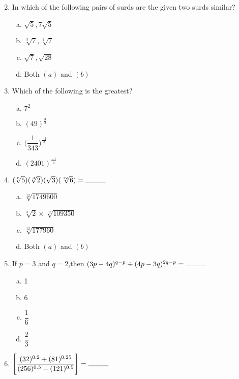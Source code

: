\begin{multicols}{2}
\begin{enumerate}
\begin{multicols}{2}
\begin{enumerate}[(a)]
\end{enumerate}
\end{multicols}
\item In which of the following pairs of surds are the given two surds similar?
\begin{multicols}{2}
\begin{enumerate}[(a)]
\item $\sqrt{5},7\sqrt{5}$
\item $\sqrt[3]{7},\sqrt[2]{7}$
\item $\sqrt{7},\sqrt{28}$
\item Both $(a)$ and $(b)$
\end{enumerate}
\end{multicols}
\item Which of the following is the greatest?
\begin{multicols}{2}
\begin{enumerate}[(a)]
\item $7^2$
\item $(49)^{\frac{3}{2}}$
\item $\Big(\dfrac{1}{343}\Big)^{\frac{-1}{3}}$
\item $(2401)^{\frac{-1}{4}}$
\end{enumerate}
\end{multicols}
\item $(\sqrt[6]{5})(\sqrt[3]{2})(\sqrt{3})(\sqrt[12]{6}) = \rule{1cm}{0.15mm}$
\begin{multicols}{2}
\begin{enumerate}[(a)]
\item $\sqrt[12]{1749600}$
\item $\sqrt[3]{2}\times\sqrt[12]{109350}$
\item $\sqrt[12]{177960}$
\item Both $(a)$ and $(b)$
\end{enumerate}
\end{multicols}
\item If $p = 3$ and $q = 2$,then $(3p-4q)^{q-p}\div(4p-3q)^{2q-p} = \rule{1cm}{0.15mm}$ 
\begin{multicols}{2}
\begin{enumerate}[(a)]
\item 1
\item 6
\item $\dfrac{1}{6}$
\item $\dfrac{2}{3}$
\end{enumerate}
\end{multicols}
\item $\Bigg[\dfrac{(32)^{0.2}+(81)^{0.25}}{(256)^{0.5}-(121)^{0.5}}\Bigg] = \rule{1cm}{0.15mm}$

\end{enumerate}
\end{multicols}
